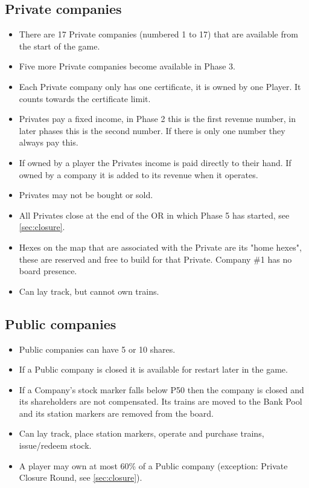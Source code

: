 \documentclass[a4paper,twocolumn]{article}
\begin{document}
\subsection{Private companies}
\begin{itemize}
	\item There are 17 Private companies (numbered 1 to 17) that are available
	from the start of the game.
	\item Five more Private companies become available in Phase 3.
	\item Each Private company only has one certificate, it is owned by one
	Player. It counts towards the certificate limit.
	\item Privates pay a fixed income, in Phase 2 this is the first revenue
	number, in later phases this is the second number. If there is only one
	number they always pay this.
	\item If owned by a player the Privates income is paid directly to their
	hand. If owned by a company it is added to its revenue when it operates.
	\item Privates may not be bought or sold.
	\item All Privates close at the end of the OR in which Phase 5 has started,
	see \autoref{sec:closure}.
	\item Hexes on the map that are associated with the Private are its "home
	hexes", these are reserved and free to build for that Private. Company \#1
	has no board presence.
	\item Can lay track, but cannot own trains.
\end{itemize}

\subsection{Public companies}
\begin{itemize}
	\item Public companies can have 5 or 10 shares.
	\item If a Public company is closed it is available for restart later in the
	game.
	\item If a Company's stock marker falls below P50 then the company is closed
	and its shareholders are not compensated. Its trains are moved to the Bank
	Pool and its station markers are removed from the board.
	\item Can lay track, place station markers, operate and purchase trains,
	issue/redeem stock.
	\item A player may own at most 60\% of a Public company (exception: Private
	Closure Round, see \autoref{sec:closure}).
\end{itemize}
\end{document}
